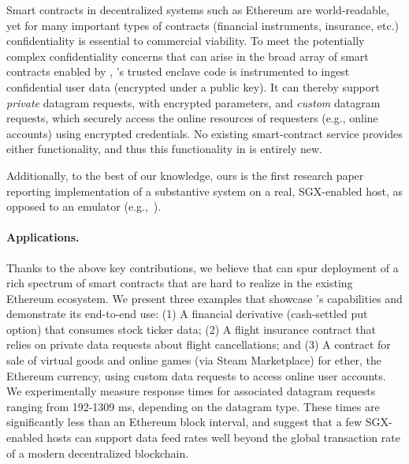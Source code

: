 \vspace{2mm}
 Smart contracts in decentralized systems such as Ethereum are world-readable, yet for many important types of contracts (financial instruments, insurance, etc.) confidentiality is essential to commercial viability. To meet the potentially complex confidentiality concerns that can arise in the broad array of smart contracts enabled by \tc, \tc's trusted enclave code is instrumented to ingest confidential user data (encrypted under a \tc public key). It can thereby support {\em private} datagram requests, with encrypted parameters, and {\em custom} datagram requests, which securely access the online resources of requesters (e.g., online accounts) using encrypted credentials. No existing smart-contract service provides either functionality, and thus this functionality in \tc is entirely new.

\vspace{2mm}
Additionally, to the best of our knowledge, ours is the first research paper reporting implementation of a substantive system on a real, SGX-enabled host, as opposed to an emulator (e.g.,~\cite{haven,VC3}).

\paragraph{Applications.} Thanks to the above key contributions, we believe that \tc can spur deployment of a rich spectrum of smart contracts that are hard to realize in the existing Ethereum ecosystem. We present three examples that showcase \tc's capabilities and demonstrate its end-to-end use: (1) A financial derivative (cash-settled put option) that consumes stock ticker data; (2) A flight insurance contract that relies on private data requests about flight cancellations; and (3) A contract for sale of virtual goods and online games (via Steam Marketplace) for ether, the Ethereum currency, using custom data requests to access online user accounts. We experimentally measure response times for associated datagram requests ranging from 192-1309 ms, depending on the datagram type. These times are significantly less than an Ethereum block interval, and suggest that a few SGX-enabled hosts can support \tc data feed rates well beyond the global transaction rate of a modern decentralized blockchain.

